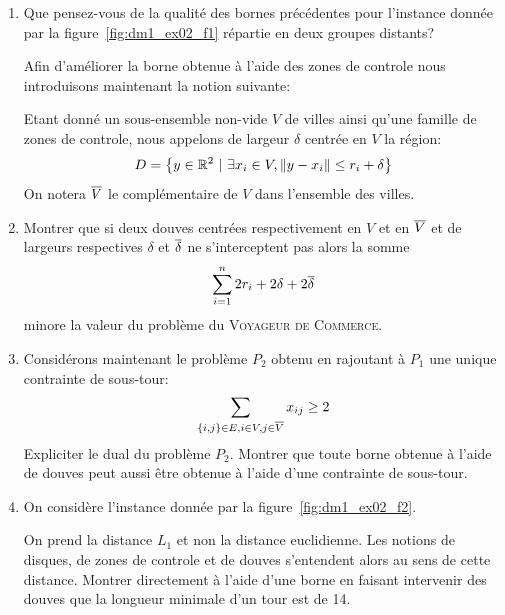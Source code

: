 \begin{td-exo}
\begin{enumerate}
        \item Que pensez-vous de la qualité des bornes précédentes pour l'instance donnée par la figure~\ref{fig:dm1_ex02_f1} répartie en deux groupes distants?

        

        Afin d'améliorer la borne obtenue à l'aide des zones de controle nous introduisons maintenant la notion suivante:

        Etant donné un sous-ensemble non-vide \(V\) de villes ainsi qu'une famille de zones de controle, nous appelons  de largeur \(\delta\) centrée en \(V\) la région:
        \begin{equation*}
            D = \left\{
                y\in \mathbb{R}^2\ |\ \exists x_i\in V, \|y-x_i\| \leq r_i + \delta
            \right\}
        \end{equation*}
        On notera \(\overline{V}\) le complémentaire de \(V\) dans l'ensemble des villes.

        \item Montrer que si deux douves centrées respectivement en \(V\) et en \(\overline{V}\) et de largeurs respectives \(\delta\) et \(\overline{\delta}\) ne s'interceptent pas alors la somme
        \begin{equation*}
            \sum_{i=1}^n 2r_i + 2\delta + 2\overline{\delta}
        \end{equation*}
        minore la valeur du problème du \textsc{Voyageur de Commerce}.

        \item Considérons maintenant le problème \(P_2\) obtenu en rajoutant à \(P_1\) une unique contrainte de sous-tour:
        \begin{equation*}
            \sum_{\{i,j\}\in E,i\in V,j\in\overline{V}} x_{ij} \geq 2
        \end{equation*}
        Expliciter le dual du problème \(P_2\).
        Montrer que toute borne obtenue à l'aide de douves peut aussi être obtenue à l'aide d'une contrainte de sous-tour.

        \item On considère l'instance donnée par la figure~\ref{fig:dm1_ex02_f2}. 
        
        
        On prend la distance \(L_1\) et non la distance euclidienne.
        Les notions de disques, de zones de controle et de douves s'entendent alors au sens de cette distance.
        Montrer directement à l'aide d'une borne en faisant intervenir des douves que la longueur minimale d'un tour est de 14.
    \end{enumerate}
\end{td-exo}


